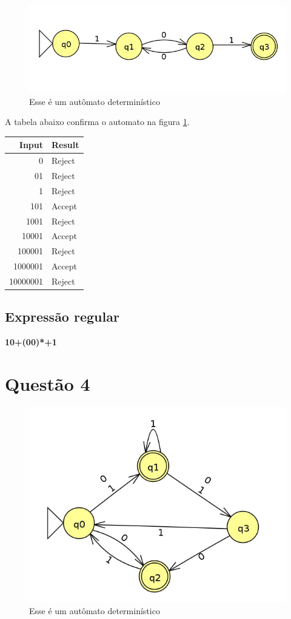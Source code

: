 \documentclass[11pt]{article}
\begin{document}
\begin{figure}[htbp]
\centering
\includegraphics[width=.9\linewidth]{./q3/q3.jpg}
\caption{\label{fig:org84f94cc}
Esse é um autômato determinístico}
\end{figure}

A tabela abaixo confirma o automato na figura \ref{fig:org84f94cc}. 

\begin{center}
\begin{tabular}{rl}
Input & Result\\
\hline
0 & Reject\\
01 & Reject\\
1 & Reject\\
101 & Accept\\
1001 & Reject\\
10001 & Accept\\
100001 & Reject\\
1000001 & Accept\\
10000001 & Reject\\
\end{tabular}
\end{center}
\subsection{Expressão regular}
\label{sec:org407e6ab}

\textbf{10+(00)*+1} 
\section{Questão 4}
\label{sec:org0b089b3}
\begin{figure}[htbp]
\centering
\includegraphics[width=.9\linewidth]{./q4/q4.jpg}
\caption{\label{fig:org4674e76}
Esse é um autômato determinístico}
\end{figure}
\end{document}
